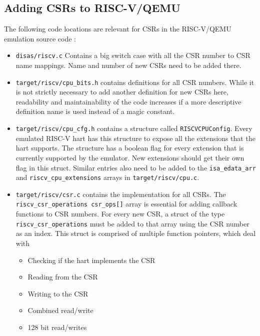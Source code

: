 \subsection{Adding CSRs to RISC-V/QEMU}

The following code locations are relevant for CSRs in the RISC-V/QEMU emulation source code \cite{QEMUSource2024}:
\begin{itemize}
    \item \texttt{disas/riscv.c} Contains a big switch case with all the CSR number to CSR name mappings.
          Name and number of new CSRs need to be added there.
    \item \texttt{target/riscv/cpu\_bits.h} contains definitions for all CSR numbers.
          While it is not strictly necessary to add another definition for new CSRs here, readability and maintainability
          of the code increases if a more descriptive definition name is used instead of a magic constant.
    \item \texttt{target/riscv/cpu\_cfg.h} contains a structure called \texttt{RISCVCPUConfig}. Every emulated RISC-V hart
          has this structure to expose all the extensions that the hart supports.
          The structure has a boolean flag for every extension that is currently supported by the emulator.
          New extensions should get their own flag in this struct.
          Similar entries also need to be added to the \texttt{isa\_edata\_arr} and \texttt{riscv\_cpu\_extensions} arrays in \texttt{target/riscv/cpu.c}.
    \item \texttt{target/riscv/csr.c} contains the implementation for all CSRs. The \texttt{riscv\_csr\_operations csr\_ops[]}
          array is essential for adding callback functions to CSR numbers.
          For every new CSR, a struct of the type \texttt{riscv\_csr\_operations} must be added to that array using the
          CSR number as an index. This struct is comprised of multiple function pointers, which deal with
          \begin{itemize}
              \item Checking if the hart implements the CSR
              \item Reading from the CSR
              \item Writing to the CSR
              \item Combined read/write
              \item 128 bit read/writes
          \end{itemize}
\end{itemize}

